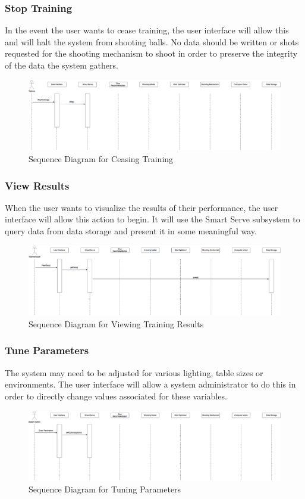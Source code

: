 \documentclass[11pt]{article}
\begin{document}
\subsubsection{Stop Training}
In the event the user wants to cease training, the user interface will allow this and will halt the system from shooting balls. No data should be written or shots requested for the shooting mechanism to shoot in order to preserve the integrity of the data the system gathers.
\begin{figure}[H]
   \centering
   \includegraphics[width=\textwidth]{img/SequenceDiagram-Stop.png}
   \caption{Sequence Diagram for Ceasing Training}
   \label{fig:stop}
\end{figure}
\subsubsection{View Results}
When the user wants to visualize the results of their performance, the user interface will allow this action to begin. It will use the Smart Serve subsystem to query data from data storage and present it in some meaningful way.
\begin{figure}[H]
   \centering
   \includegraphics[width=\textwidth]{img/SequenceDiagram-View.png}
   \caption{Sequence Diagram for Viewing Training Results}
   \label{fig:view}
\end{figure}
\subsubsection{Tune Parameters}
The system may need to be adjusted for various lighting, table sizes or environments. The user interface will allow a system administrator to do this in order to directly change values associated for these variables.
\begin{figure}[H]
   \centering
   \includegraphics[width=\textwidth]{img/SequenceDiagram-Tune.png}
   \caption{Sequence Diagram for Tuning Parameters}
   \label{fig:tune}
\end{figure}
\end{document}

